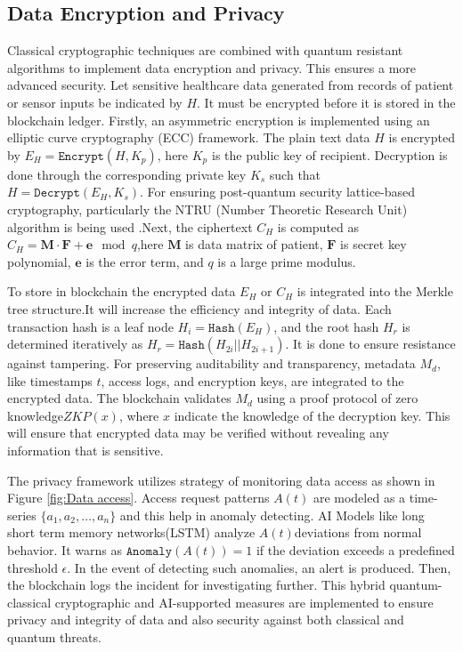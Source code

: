 \documentclass[pdflatex,sn-mathphys-num]{sn-jnl}
\theoremstyle{thmstyleone}%
\theoremstyle{thmstyletwo}%
\theoremstyle{thmstylethree}%
\begin{document}
\subsection{Data Encryption and Privacy}
Classical cryptographic techniques are combined with quantum resistant algorithms to implement data encryption and privacy. This ensures a more advanced security. Let sensitive healthcare data generated from records of patient  or sensor inputs be indicated by \( H \). It must be encrypted before it is stored in the blockchain ledger. Firstly, an asymmetric encryption is implemented using an elliptic curve cryptography (ECC) framework. The plain text data \( H \) is encrypted by \( E_H = \texttt{Encrypt}(H, K_p) \), here \( K_p \) is the public key of recipient. Decryption is done through the corresponding private key \( K_s \) such that \( H = \texttt{Decrypt}(E_H, K_s) \). For ensuring post-quantum security lattice-based cryptography, particularly the NTRU (Number Theoretic Research Unit) algorithm is being used \cite{bib18}.Next, the ciphertext \( C_H \) is computed as \( C_H = \mathbf{M} \cdot \mathbf{F} + \mathbf{e} \mod q \),here \( \mathbf{M} \) is data matrix of patient, \( \mathbf{F} \) is secret key polynomial, \( \mathbf{e} \) is the error term, and \( q \) is a large prime modulus.

To store in blockchain the encrypted data \( E_H \) or \( C_H \) is integrated into the Merkle tree structure.It will increase the efficiency and integrity of data. Each transaction hash is a leaf node \( H_i = \texttt{Hash}(E_H) \), and the root hash \( H_r \) is determined iteratively as \( H_r = \texttt{Hash}(H_{2i} || H_{2i+1}) \). It is done to ensure resistance against tampering. For preserving auditability and transparency, metadata \( M_d \), like timestamps \( t \), access logs, and encryption keys, are integrated to the encrypted data. The blockchain validates \( M_d \) using a  proof protocol of zero knowledge\( ZKP(x) \), where \( x \) indicate the knowledge of the decryption key. This will ensure that encrypted data may be verified without revealing any information that is sensitive.

The privacy framework utilizes strategy of monitoring data access as shown in Figure \ref{fig:Data access}. Access request patterns \( A(t) \) are modeled as a time-series \( \{a_1, a_2, \dots, a_n\} \) and this help in anomaly detecting. AI Models like long short term memory networks(LSTM) analyze \( A(t) \)deviations from normal behavior. It warns as \( \texttt{Anomaly}(A(t)) = 1 \) if the deviation exceeds a predefined threshold \( \epsilon \). In the event of detecting such anomalies, an alert is produced. Then, the blockchain logs the incident for investigating further. This hybrid quantum-classical cryptographic and AI-supported measures are implemented to ensure privacy and integrity of data and also security against both classical and quantum threats.
\end{document}
